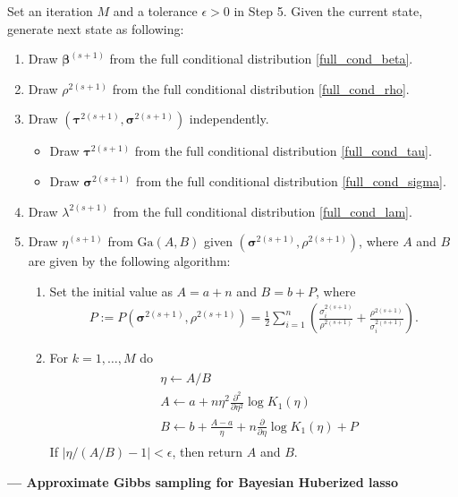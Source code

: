 \documentclass[11pt]{article}
\theoremstyle{plain}
\theoremstyle{definition}
\begin{document}
\begin{algorithm*}[t]

Set an iteration $M$ and a tolerance $\epsilon>0$ in Step 5. Given the current state, generate next state as following:

\begin{enumerate}
\item Draw $\bm{\beta}^{(s+1)}$ from the full conditional distribution \eqref{full_cond_beta}. 

\item Draw $\rho^{2(s+1)}$ from the full conditional distribution \eqref{full_cond_rho}.

\item Draw $(\bm{\tau}^{2(s+1)},\bm{\sigma}^{2(s+1)})$ independently.
\begin{itemize}

\item Draw $\bm{\tau}^{2(s+1)}$ from the full conditional distribution \eqref{full_cond_tau}.

\item Draw $\bm{\sigma}^{2(s+1)}$ from the full conditional distribution \eqref{full_cond_sigma}.

\end{itemize}

\item Draw $\lambda^{2(s+1)}$ from the full conditional distribution \eqref{full_cond_lam}.

\item Draw $\eta^{(s+1)}$ from $\mathrm{Ga}(A,B)$ given $(\bm{\sigma}^{2(s+1)},\rho^{2(s+1)})$, where $A$ and $B$ are given by the following algorithm:
\begin{enumerate}
\item Set the initial value as $A=a+n$ and $B=b+P$, where
\begin{align}\label{def_P}
P:=P(\bm{\sigma}^{2(s+1)},\rho^{2(s+1)})=\frac{1}{2}\sum_{i=1}^n\left(\frac{\sigma_{i}^{2(s+1)}}{\rho^{2(s+1)}}+\frac{\rho^{2(s+1)}}{\sigma_{i}^{2(s+1)}}\right).
\end{align}
\item For $k=1,\dots,M$ do
\begin{align}\label{AB}
\begin{split}
&\eta\leftarrow A/B\\
&A\leftarrow a+n\eta^2\frac{\partial^2}{\partial \eta^2}\log K_{1}(\eta)\\
&B \leftarrow b+\frac{A-a}{\eta}+n\frac{\partial}{\partial \eta}\log K_{1}(\eta)+P
\end{split}
\end{align}
If $|\eta/(A/B)-1|<\epsilon$, then return $A$ and $B$.
\end{enumerate}
\end{enumerate}
\caption{\bf--- Approximate Gibbs sampling for Bayesian Huberized lasso}
\label{algo:Gibbs2}
\end{algorithm*}
\end{document}

